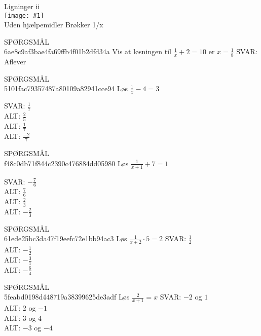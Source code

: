 \documentclass[]{article}
\newcounter{spgcounter}
\newenvironment{question}[2]{\addtocounter{spgcounter}{1} SPØRGSMÅL \thespgcounter\\ }{\hspace{50px}}
\newcommand{\name}[1]{{\huge #1}\\}
\newcommand{\tag}[1]{#1}
\newcommand{\cover}[1]{\texttt{[image: \#1]}\\}
\newcommand{\answer}[1]{{\color{green} SVAR: #1}\\}
\newcommand{\alt}[1]{{\color{red} ALT: #1}\\}
\begin{document}
\name{Ligninger ii}
\cover{brøkkerligninger.png}
\tag{Uden hjælpemidler}
\tag{Brøkker}
\tag{1/x}

\begin{question}{multi}\id{6ae8c9af3bae4fa69ffb4f01b2dfd34a}
Vis at løsningen til $\frac{1}{x} + 2 = 10$ er $x=\frac{1}{8}$
\answer{Aflever}
\end{question}

\begin{question}{multi}\id{5101fac79357487a80109a82941cce94}
Løs $\frac{1}{x} - 4 = 3$

\answer{$\frac{1}{7}$}
\alt{$\frac{2}{5}$}
\alt{$\frac{1}{7}$}
\alt{$\frac{-2}{7}$}
\end{question}

\begin{question}{multi}\id{f48c0db71f844c2390c476884dd05980}
Løs $\frac{1}{x+1} + 7 = 1$

\answer{$-\frac{7}{6}$}
\alt{$\frac{7}{6}$}
\alt{$\frac{2}{3}$}
\alt{$-\frac{2}{3}$}
\end{question}

\begin{question}{multi}\id{61ede25bc3da47f19eefc72e1bb94ac3}
Løs $\frac{1}{x+2} \cdot 5 = 2$
\answer{$\frac{1}{2}$}
\alt{$-\frac{1}{2}$}
\alt{$-\frac{3}{1}$}
\alt{$-\frac{6}{4}$}
\end{question}

\begin{question}{multi}\id{5feabd0198d448719a38399625de3adf}
Løs $\frac{2}{x+1} = x$
\answer{$-2$ og $1$}
\alt{$2$ og $-1$}
\alt{$3$ og $4$}
\alt{$-3$ og $-4$}

\end{question}
\end{document}
